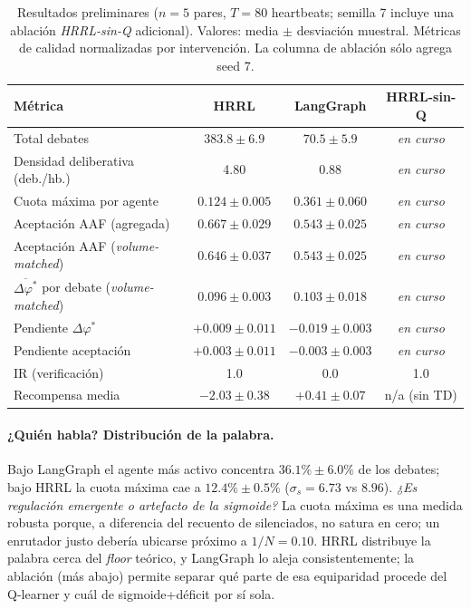 \documentclass{llncs}
\begin{document}
\begin{table}
\caption{Resultados preliminares ($n{=}5$ pares, $T{=}80$ heartbeats;
semilla 7 incluye una ablaci\'on \emph{HRRL-sin-Q} adicional). Valores:
media $\pm$ desviaci\'on muestral. M\'etricas de calidad normalizadas
por intervenci\'on. La columna de ablaci\'on s\'olo agrega seed 7.}
\label{tab:results}
\centering\small
\begin{tabular}{|l|c|c|c|}
\hline
\textbf{M\'etrica} & \textbf{HRRL} & \textbf{LangGraph} & \textbf{HRRL-sin-Q} \\
\hline
Total debates                       & $383.8 \pm 6.9$ & $70.5 \pm 5.9$ & \emph{en curso} \\
Densidad deliberativa (deb./hb.)    & 4.80            & 0.88           & \emph{en curso} \\
\hline
Cuota m\'axima por agente           & $0.124 \pm 0.005$ & $0.361 \pm 0.060$ & \emph{en curso} \\
\hline
Aceptaci\'on AAF (agregada)         & $0.667 \pm 0.029$ & $0.543 \pm 0.025$ & \emph{en curso} \\
Aceptaci\'on AAF (\emph{volume-matched}) & $0.646 \pm 0.037$ & $0.543 \pm 0.025$ & \emph{en curso} \\
$\overline{\Delta\varphi^*}$ por debate (\emph{volume-matched}) & $0.096 \pm 0.003$ & $0.103 \pm 0.018$ & \emph{en curso} \\
\hline
Pendiente $\Delta\varphi^*$         & $+0.009 \pm 0.011$ & $-0.019 \pm 0.003$ & \emph{en curso} \\
Pendiente aceptaci\'on              & $+0.003 \pm 0.011$ & $-0.003 \pm 0.003$ & \emph{en curso} \\
\hline
IR (verificaci\'on)                 & 1.0             & 0.0            & 1.0 \\
Recompensa media                    & $-2.03 \pm 0.38$ & $+0.41 \pm 0.07$ & n/a (sin TD) \\
\hline
\end{tabular}
\end{table}

\paragraph{¿Qui\'en habla? Distribuci\'on de la palabra.}
Bajo LangGraph el agente m\'as activo concentra $36.1\% \pm 6.0\%$ de
los debates; bajo HRRL la cuota m\'axima cae a $12.4\% \pm 0.5\%$
($\sigma_s{=}6.73$ vs $8.96$). \emph{¿Es regulaci\'on emergente o
artefacto de la sigmoide?} La cuota m\'axima es una medida robusta
porque, a diferencia del recuento de silenciados, no satura en cero;
un enrutador justo deber\'ia ubicarse pr\'oximo a $1/N{=}0.10$. HRRL
distribuye la palabra cerca del \emph{floor} te\'orico, y LangGraph lo
aleja consistentemente; la ablaci\'on (m\'as abajo) permite separar
qu\'e parte de esa equiparidad procede del Q-learner y cu\'al de
sigmoide+d\'eficit por s\'i sola.
\end{document}
